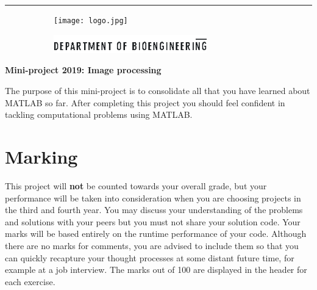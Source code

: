%
%
%





\hrule

\begin{figure}[t]
	\begin{subfigure}[b]{0.40\linewidth} 					
    \texttt{[image: logo.jpg]}     
  \end{subfigure}
    \hfill
	\begin{subfigure}[B]{0.40\linewidth} 						
    \includegraphics[height=0.8cm]{Pictures/bioengineering_logo_right.eps}
  \end{subfigure}
    \hfill
\end{figure}

\vspace{1cm}


\begin{center}
{\large \textbf{Mini-project 2019: Image processing}} %
\end{center}
The purpose of this mini-project is to consolidate all that you have learned about MATLAB so far. After completing this project you should feel confident in tackling computational problems using MATLAB.

\section{Marking}
This project will \textbf{not} be counted towards your overall grade, but your performance will be taken into consideration when you are choosing projects in the third and fourth year. You may discuss your understanding of the problems and solutions with your peers but you must not share your solution code. Your marks will be based entirely on the runtime performance of your code. Although there are no marks for comments, you are advised to include them so that you can quickly recapture your thought processes at some distant future time, for example at a job interview.
The marks out of 100 are displayed in the header for each exercise. 

